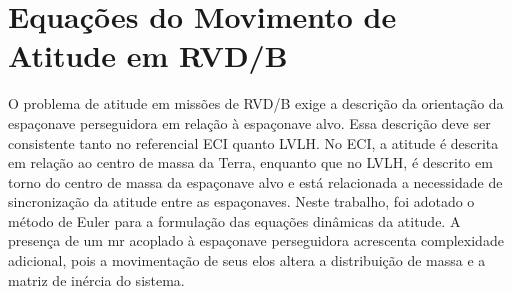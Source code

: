 \section{Equações do Movimento de Atitude em RVD/B}
\label{sec:equacoes_movimento_atitude}

O problema de atitude em missões de RVD/B exige a descrição da orientação da espaçonave perseguidora em relação à espaçonave alvo.
Essa descrição deve ser consistente tanto no referencial ECI quanto LVLH.
No ECI, a atitude é descrita em relação ao centro de massa da Terra, enquanto que no LVLH, é descrito em torno do centro de massa da espaçonave alvo e está relacionada a necessidade de sincronização da atitude entre as espaçonaves.
Neste trabalho, foi adotado o método de Euler para a formulação das equações dinâmicas da atitude.
A presença de um \gls{mr} acoplado à espaçonave perseguidora acrescenta complexidade adicional, pois a movimentação de seus elos altera a distribuição de massa e a matriz de inércia do sistema.






